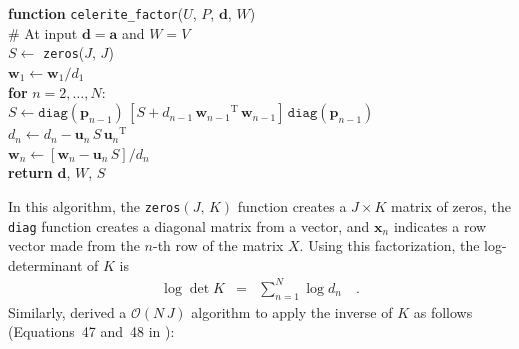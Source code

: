 \documentclass[rnaas]{aastex62}
\newcommand{\T}{\ensuremath{\mathrm{T}}}
\newcommand{\bvec}[1]{{\ensuremath{\boldsymbol{#1}}}}
\begin{document}
\medskip
\begin{minipage}{\linewidth}
\textbf{function} \texttt{celerite\_factor}($U$, $P$, $\bvec{d}$, $W$) \\
\hspace*{2em}\textsf{\# At input $\bvec{d} = \bvec{a}$ and $W = V$} \\
\hspace*{2em}$S \gets$ \texttt{zeros}($J$, $J$) \\
    \hspace*{2em}$\bvec{w}_1 \gets \bvec{w}_1 / d_{1}$ \\
\hspace*{2em}\textbf{for} $n = 2,\ldots,N$:\\
\hspace*{2em}\hspace*{2em}$S \gets \texttt{diag}(\bvec{p}_{n-1})\,[
    S + d_{n-1}\,{\bvec{w}_{n-1}}^\T\,{\bvec{w}_{n-1}}
]\,\texttt{diag}(\bvec{p}_{n-1})$ \\
\hspace*{2em}\hspace*{2em}$d_{n} \gets d_{n} - \bvec{u}_n\,S\,{\bvec{u}_n}^\T$\\
\hspace*{2em}\hspace*{2em}$\bvec{w}_n \gets \left[\bvec{w}_n -
    \bvec{u}_n\,S \right] / d_{n}$\\
    \hspace*{2em}\textbf{return} $\bvec{d}$, $W$, $S$
\end{minipage}
\medskip

\noindent In this algorithm, the \texttt{zeros}$(J,\,K)$ function creates a $J
\times K$ matrix of zeros, the \texttt{diag} function creates a diagonal
matrix from a vector, and $\bvec{x}_n$ indicates a row vector made from the
$n$-th row of the matrix $X$.
Using this factorization, the log-determinant of $K$ is
\begin{eqnarray}
\log \det K &=& \sum_{n=1}^N \log d_{n} \quad.
\end{eqnarray}
Similarly, \citet{Foreman-Mackey:2017} derived a $\mathcal{O}(N\,J)$ algorithm
to apply the inverse of $K$ as follows (Equations~47 and~48 in
\citealt{Foreman-Mackey:2017}):
\end{document}
